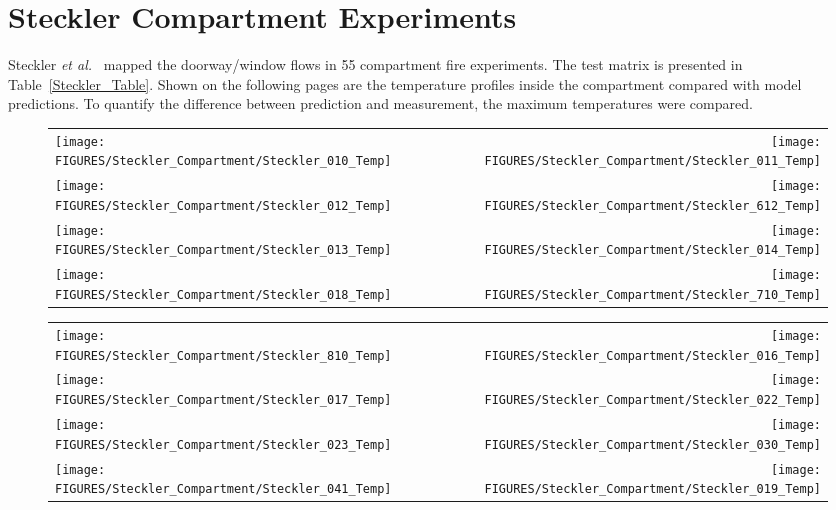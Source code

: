 \clearpage

\section{Steckler Compartment Experiments}

Steckler {\em et al.}~\cite{Steckler:1982} mapped the doorway/window flows in 55 compartment fire experiments. The test matrix is presented in Table~\ref{Steckler_Table}. Shown on the following pages are the temperature profiles inside the compartment compared with model predictions. To quantify the difference between prediction and measurement, the maximum temperatures were compared.



\begin{figure}[p]
\begin{tabular*}{\textwidth}{l@{\extracolsep{\fill}}r}
\texttt{[image: FIGURES/Steckler\_Compartment/Steckler\_010\_Temp]} &
\texttt{[image: FIGURES/Steckler\_Compartment/Steckler\_011\_Temp]} \\
\texttt{[image: FIGURES/Steckler\_Compartment/Steckler\_012\_Temp]} &
\texttt{[image: FIGURES/Steckler\_Compartment/Steckler\_612\_Temp]} \\
\texttt{[image: FIGURES/Steckler\_Compartment/Steckler\_013\_Temp]} &
\texttt{[image: FIGURES/Steckler\_Compartment/Steckler\_014\_Temp]} \\
\texttt{[image: FIGURES/Steckler\_Compartment/Steckler\_018\_Temp]} &
\texttt{[image: FIGURES/Steckler\_Compartment/Steckler\_710\_Temp]}
\end{tabular*}
\label{Steckler_Temp_1}
\end{figure}

\begin{figure}[p]
\begin{tabular*}{\textwidth}{l@{\extracolsep{\fill}}r}
\texttt{[image: FIGURES/Steckler\_Compartment/Steckler\_810\_Temp]} &
\texttt{[image: FIGURES/Steckler\_Compartment/Steckler\_016\_Temp]} \\
\texttt{[image: FIGURES/Steckler\_Compartment/Steckler\_017\_Temp]} &
\texttt{[image: FIGURES/Steckler\_Compartment/Steckler\_022\_Temp]} \\
\texttt{[image: FIGURES/Steckler\_Compartment/Steckler\_023\_Temp]} &
\texttt{[image: FIGURES/Steckler\_Compartment/Steckler\_030\_Temp]} \\
\texttt{[image: FIGURES/Steckler\_Compartment/Steckler\_041\_Temp]} &
\texttt{[image: FIGURES/Steckler\_Compartment/Steckler\_019\_Temp]}
\end{tabular*}
\label{Steckler_Temp_2}
\end{figure}

